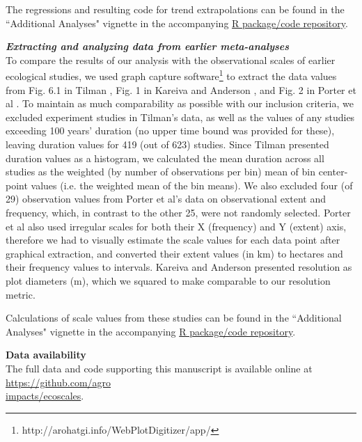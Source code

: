 \documentclass[12pt]{article}
\begin{document}
The regressions and resulting code for trend extrapolations can be found in the ``Additional Analyses" vignette in the accompanying \href{https://github.com/agroimpacts/ecoscales}{R package/code repository}.

\vspace{5pt}
\noindent \textbf{\emph{Extracting and analyzing data from earlier meta-analyses}}\\
To compare the results of our analysis with the observational scales of earlier ecological studies, we used graph capture software\footnote{http://arohatgi.info/WebPlotDigitizer/app/} to extract the data values from Fig. 6.1 in Tilman \cite{tilman_ecological_1989}, Fig. 1 in Kareiva and Anderson \cite{kareiva_spatial_1988}, and Fig. 2 in Porter et al \cite{porter_wireless_2005}. To maintain as much comparability as possible with our inclusion criteria, we excluded experiment studies in Tilman's data, as well as the values of any studies exceeding 100 years' duration (no upper time bound was provided for these), leaving duration values for 419 (out of 623) studies. Since Tilman presented duration values as a histogram, we calculated the mean duration across all studies as the weighted (by number of observations per bin) mean of bin center-point values (i.e. the weighted mean of the bin means).  We also excluded four (of 29) observation values from Porter et al's data on observational extent and frequency, which, in contrast to the other 25, were not randomly selected. Porter et al also used irregular scales for both their X (frequency) and Y (extent) axis, therefore we had to visually estimate the scale values for each data point after graphical extraction, and converted their extent values (in km) to hectares and their frequency values to intervals. Kareiva and Anderson \cite{kareiva_spatial_1988} presented resolution as plot diameters (m), which we squared to make comparable to our resolution metric.  

Calculations of scale values from these studies can be found in the ``Additional Analyses" vignette in the accompanying \href{https://github.com/agroimpacts/ecoscales}{R package/code repository}.


\vspace{10pt}
\noindent \textbf{Data availability}
\vspace{5pt}
\\
The full data and code supporting this manuscript is available online at \href{https://github.com/agroimpacts/ecoscales}{https://github.com/agro\\impacts/ecoscales}.
\end{document}
